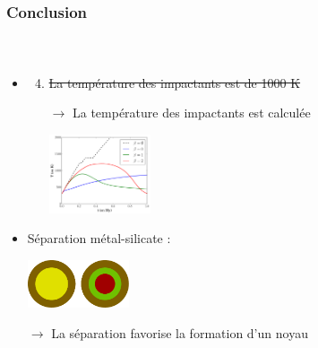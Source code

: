 \documentclass{beamer}
\begin{document}
\begin{frame}
	\frametitle{Conclusion}
	\framesubtitle{\ }
\begin{itemize}
\item 
\begin{enumerate}
\setcounter{enumi}{3}
\item \sout{La température des impactants est de 1000 K}

$\rightarrow$ La température des impactants est calculée


\center \includegraphics[width = 3cm]{figures/tempMoy_acretion.pdf}
\vspace{-0.45cm}

\center {}

\end{enumerate}

\item Séparation métal-silicate :

\center \includegraphics[width = 3cm]{figures/phaseseparation.pdf}

$\rightarrow$ La séparation favorise la formation d'un noyau


\end{itemize}
\end{frame}
\end{document}
